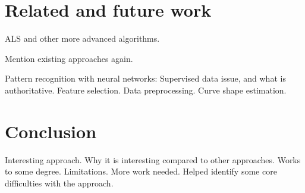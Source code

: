 \documentclass[12pt,a4paper]{article}
\begin{document}
\section{Related and future work}

ALS and other more advanced algorithms.

Mention existing approaches again.

Pattern recognition with neural networks: Supervised data issue, and what is authoritative. Feature selection. Data preprocessing. Curve shape estimation. 

\section{Conclusion}

Interesting approach. Why it is interesting compared to other approaches. Works to some degree. Limitations. More work needed. Helped identify some core difficulties with the approach.
\end{document}
